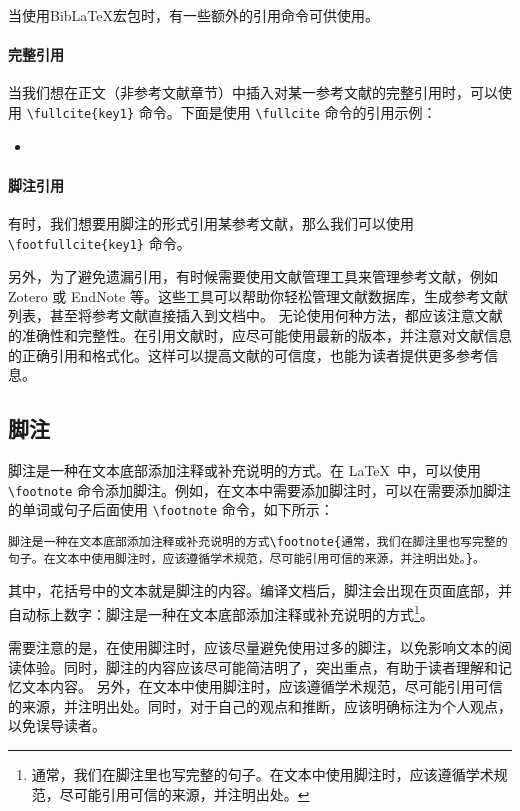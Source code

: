 当使用BibLaTeX宏包时，有一些额外的引用命令可供使用。

\paragraph{完整引用}

当我们想在正文（非参考文献章节）中插入对某一参考文献的完整引用时，可以使用 \verb|\fullcite{key1}| 命令。下面是使用 \verb|\fullcite| 命令的引用示例：

\begin{itemize}
    \item {}
\end{itemize}

\paragraph{脚注引用}

有时，我们想要用脚注的形式引用某参考文献，那么我们可以使用 \verb|\footfullcite{key1}| 命令。
\fi

另外，为了避免遗漏引用，有时候需要使用文献管理工具来管理参考文献，例如 Zotero 或 EndNote 等。这些工具可以帮助你轻松管理文献数据库，生成参考文献列表，甚至将参考文献直接插入到文档中。
无论使用何种方法，都应该注意文献的准确性和完整性。在引用文献时，应尽可能使用最新的版本，并注意对文献信息的正确引用和格式化。这样可以提高文献的可信度，也能为读者提供更多参考信息。

\subsection{脚注}

脚注是一种在文本底部添加注释或补充说明的方式。在 \LaTeX\ 中，可以使用 \verb|\footnote| 命令添加脚注。例如，在文本中需要添加脚注时，可以在需要添加脚注的单词或句子后面使用 \verb|\footnote| 命令，如下所示：

\begin{Verbatim}
脚注是一种在文本底部添加注释或补充说明的方式\footnote{通常，我们在脚注里也写完整的句子。在文本中使用脚注时，应该遵循学术规范，尽可能引用可信的来源，并注明出处。}。
\end{Verbatim}

其中，花括号中的文本就是脚注的内容。编译文档后，脚注会出现在页面底部，并自动标上数字：脚注是一种在文本底部添加注释或补充说明的方式\footnote{通常，我们在脚注里也写完整的句子。在文本中使用脚注时，应该遵循学术规范，尽可能引用可信的来源，并注明出处。}。

需要注意的是，在使用脚注时，应该尽量避免使用过多的脚注，以免影响文本的阅读体验。同时，脚注的内容应该尽可能简洁明了，突出重点，有助于读者理解和记忆文本内容。
另外，在文本中使用脚注时，应该遵循学术规范，尽可能引用可信的来源，并注明出处。同时，对于自己的观点和推断，应该明确标注为个人观点，以免误导读者。

